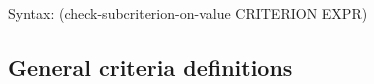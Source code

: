 {\ttfamily\begin{tabbing}
\textrm{Syntax: }(check-subcriterion-on-value CRITERION EXPR)
\end{tabbing}}
% 

\subsection{General criteria definitions}
\label{sec:def-criterion-unevaluated}


